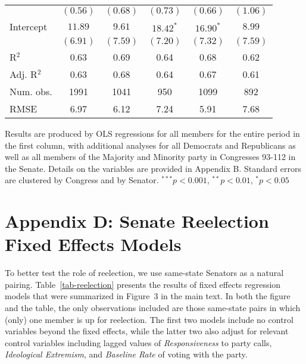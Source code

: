 \documentclass[12pt]{article}
\begin{document}
\begin{table}[H]
\begin{threeparttable}
\begin{tabular}{l c c c c c }
                      & $(0.56)$      & $(0.68)$     & $(0.73)$       & $(0.66)$     & $(1.06)$     \\
Intercept             & $11.89$       & $9.61$       & $18.42^{*}$    & $16.90^{*}$  & $8.99$       \\
                      & $(6.91)$      & $(7.59)$     & $(7.20)$       & $(7.32)$     & $(7.59)$     \\
\hline
R$^2$                 & 0.63          & 0.69         & 0.64           & 0.68         & 0.62         \\
Adj. R$^2$            & 0.63          & 0.68         & 0.64           & 0.67         & 0.61         \\
Num. obs.             & 1991          & 1041         & 950            & 1099         & 892          \\
RMSE                  & 6.97          & 6.12         & 7.24           & 5.91         & 7.68         \\
\hline
\end{tabular}
\begin{tablenotes}
   \item
   Results are produced by OLS regressions for all members for the entire period
   in the first column, with additional analyses for all Democrats and
   Republicans as well as all members of the Majority and Minority party in
   Congresses 93-112 in the Senate.
   Details on the variables are provided in Appendix B.
   Standard errors are clustered by Congress and by Senator.
$^{***}p<0.001$, $^{**}p<0.01$, $^*p<0.05$
 \end{tablenotes}
\end{threeparttable}
\end{table}


\section*{Appendix D: Senate Reelection Fixed Effects Models}
%


To better test the role of reelection, we use same-state Senators as a natural
pairing.
Table~\ref{tab-reelection} presents the results of fixed effects regression
models that were summarized in Figure~3 in the main text.
In both the figure and the table, the only observations included are those
same-state pairs in which (only) one member is up for reelection.
The first two models include no control variables beyond the fixed effects,
while the latter two also adjust for relevant control variables including
lagged values of \textit{Responsiveness} to party calls,
\textit{Ideological Extremism}, and \textit{Baseline Rate} of voting with the
party.
\end{document}

